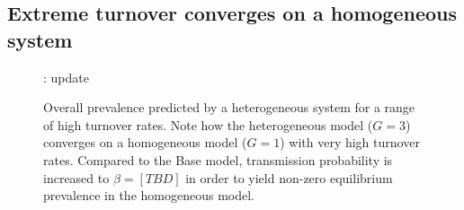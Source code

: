 \subsection{Extreme turnover converges on a homogeneous system}\label{aa:homogenize}
\begin{figure}[H]
  \centering
  : update
  \caption{Overall prevalence predicted by a heterogeneous system
    for a range of high turnover rates.
    Note how the heterogeneous model ($G = 3$) converges on a homogeneous model ($G = 1$)
    with very high turnover rates.
    Compared to the Base model,
    transmission probability is increased to $\beta = [TBD]$
    in order to yield non-zero equilibrium prevalence in the homogeneous model.}
  \label{fig:hetero-converge}
\end{figure}
